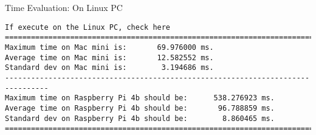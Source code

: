 \begin{frame}[fragile]{Time Evaluation: On Linux PC}
\tiny
{
\begin{verbatim}If execute on the Linux PC, check here
================================================================================
Maximum time on Mac mini is:       69.976000 ms.
Average time on Mac mini is:       12.582552 ms.
Standard dev on Mac mini is:        3.194686 ms.
--------------------------------------------------------------------------------
Maximum time on Raspberry Pi 4b should be:      538.276923 ms.
Average time on Raspberry Pi 4b should be:       96.788859 ms.
Standard dev on Raspberry Pi 4b should be:        8.860465 ms.
================================================================================
\end{verbatim}
}
\end{frame}
